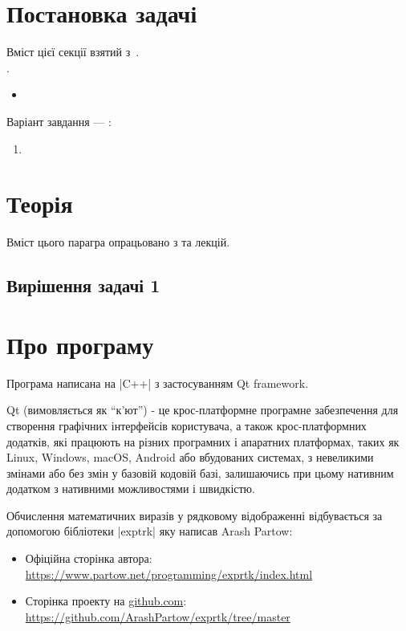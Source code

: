 \documentclass[../../../../document]{subfiles}
\begin{document}
	\chapter{Постановка задачі}
	Вміст цієї секції взятий з~\cite{computational_methods}.\\
	 \worktheme.\\
	\begin{itemize}
		\item
	\end{itemize}
	Варіант завдання --- \studentnumber:
	\begin{enumerate}
		\item
	\end{enumerate}

	\chapter{Теорія}
	Вміст цього парагра опрацьовано з \cite{computational_methods} та лекцій.
	\section{Вирішення задачі 1}

	\FloatBarrier
	\chapter{Про програму}
	Програма написана на \textinline|C++| з застосуванням Qt framework.

	Qt (вимовляється як \enquote{к'ют}) - це крос-платформне
	програмне забезпечення для створення графічних інтерфейсів користувача, а також
	крос-платформних додатків, які працюють на різних програмних і апаратних
	платформах, таких як Linux, Windows, macOS, Android або вбудованих системах, з
	невеликими змінами або без змін у базовій кодовій базі, залишаючись при цьому
	нативним додатком з нативними можливостями і швидкістю.
	
	Обчислення математичних виразів у рядковому відображенні відбувається за допомогою бібліотеки \textinline|exptrk| яку написав Arash Partow:
	\begin{itemize}
		\item Офіційна сторінка автора: \url{https://www.partow.net/programming/exprtk/index.html}
		\item Сторінка проекту на \url{github.com}: \url{https://github.com/ArashPartow/exprtk/tree/master}
	\end{itemize}
\end{document}
